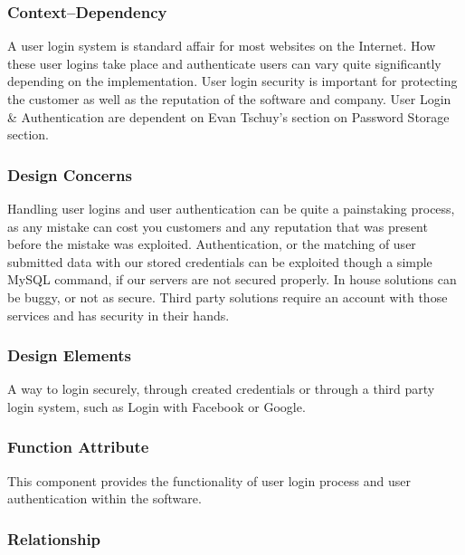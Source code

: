 \documentclass[letterpaper, 10pt, draftclsnofoot, compsoc, onecolumn]{IEEEtran}
\begin{document}
\subsubsection{Context--Dependency}
{\noindent A user login system is standard affair for most websites on the Internet. 
How these user logins take place and authenticate users can vary quite 
significantly depending on the implementation. 
User login security is important for protecting the customer as well as 
the reputation of the software and company. User Login \& Authentication 
are dependent on Evan Tschuy's section on Password Storage section. \par}

\subsubsection{Design Concerns}
{\noindent Handling user logins and user authentication can be quite a painstaking process, 
as any mistake can cost you customers and any reputation that was present 
before the mistake was exploited. Authentication, or the matching of user submitted 
data with our stored credentials can be exploited though a simple MySQL command, 
if our servers are not secured properly. In house solutions can be buggy, or not as secure.
Third party solutions require an account with those services and has security in their hands. \par}

\subsubsection{Design Elements}
{\noindent A way to login securely, through created credentials or through a 
third party login system, such as Login with Facebook or Google.  \par}

\subsubsection{Function Attribute}
{\noindent This component provides the functionality of user login process 
and user authentication within the software.\par}

\subsubsection{Relationship}
\end{document}
